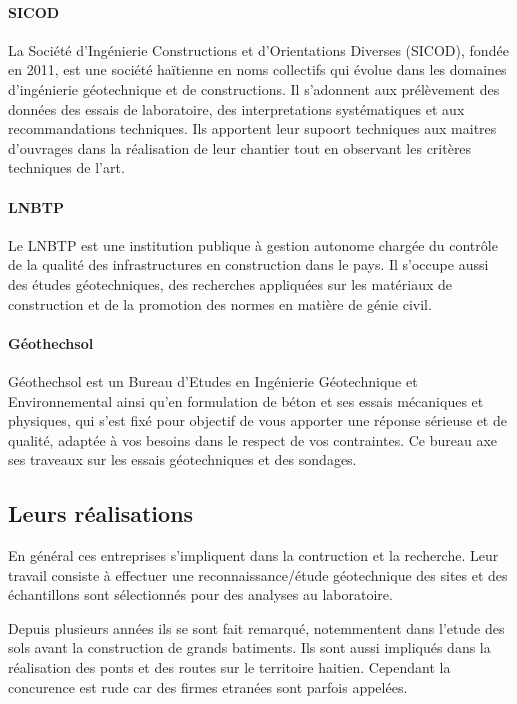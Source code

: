         \paragraph{SICOD}
        La  Société d’Ingénierie Constructions et d’Orientations Diverses (SICOD),
         fondée en 2011, est une société haïtienne en noms collectifs   qui évolue dans les domaines d’ingénierie géotechnique et de constructions.
         Il s'adonnent aux prélèvement des données des essais de laboratoire, des interpretations systématiques et aux recommandations techniques. 
         Ils apportent leur supoort techniques aux maitres d'ouvrages dans la réalisation de leur chantier tout en observant les critères techniques de l'art.
        \paragraph{LNBTP}
        Le LNBTP est une institution publique à gestion autonome chargée du contrôle de la qualité des infrastructures en construction dans le pays. Il s'occupe 
        aussi des études géotechniques, des recherches appliquées sur les matériaux de construction et de la promotion des normes en matière de génie civil.
        \paragraph{Géothechsol}
        Géothechsol est un Bureau d’Etudes en Ingénierie Géotechnique et Environnemental ainsi qu’en formulation de béton et ses essais mécaniques et physiques,
         qui s’est fixé pour objectif de vous apporter une réponse sérieuse et de qualité, adaptée à vos besoins dans le respect de vos contraintes.
         Ce bureau axe ses traveaux sur les essais géotechniques et des sondages.

        \subsection{Leurs réalisations}
        En général ces entreprises s'impliquent dans la contruction et la recherche. 
        Leur travail consiste à effectuer une reconnaissance/étude géotechnique des sites et des échantillons  sont sélectionnés pour des analyses au
        laboratoire.
        \par
        Depuis plusieurs années ils se sont fait remarqué, notemmentent dans
         l'etude des sols avant la construction de grands batiments. Ils sont aussi impliqués dans la réalisation des ponts et des routes sur le territoire
          haitien. Cependant la concurence est rude car des firmes etranées sont parfois appelées. 
